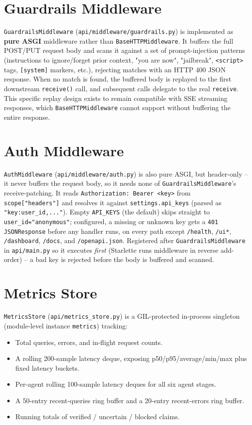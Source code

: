 \documentclass[11pt,a4paper]{report}
\newcommand{\code}[1]{\texttt{#1}}
\newcommand{\file}[1]{\texttt{\small #1}}
\begin{document}
\section{Guardrails Middleware}

\code{GuardrailsMiddleware} (\file{api/middleware/guardrails.py}) is implemented as
\textbf{pure ASGI} middleware rather than \code{BaseHTTPMiddleware}. It buffers the
full POST/PUT request body and scans it against a set of prompt-injection patterns
(instructions to ignore/forget prior context, "you are now", "jailbreak",
\code{<script>} tags, \code{[system]} markers, etc.), rejecting matches with an HTTP
400 JSON response. When no match is found, the buffered body is replayed to the first
downstream \code{receive()} call, and subsequent calls delegate to the real
\code{receive}. This specific replay design exists to remain compatible with SSE
streaming responses, which \code{BaseHTTPMiddleware} cannot support without buffering
the entire response.

\section{Auth Middleware}

\code{AuthMiddleware} (\file{api/middleware/auth.py}) is also pure ASGI, but
header-only -- it never buffers the request body, so it needs none of
\code{GuardrailsMiddleware}'s receive-patching. It reads
\code{Authorization: Bearer <key>} from \code{scope["headers"]} and resolves it
against \code{settings.api\_keys} (parsed as \code{"key:user\_id,..."}). Empty
\code{API\_KEYS} (the default) skips straight to \code{user\_id="anonymous"};
configured, a missing or unknown key gets a \code{401 JSONResponse} before any
handler runs, on every path except \code{/health}, \code{/ui*},
\code{/dashboard}, \code{/docs}, and \code{/openapi.json}. Registered after
\code{GuardrailsMiddleware} in \file{api/main.py} so it executes \emph{first}
(Starlette runs middleware in reverse add-order) -- a bad key is rejected
before the body is buffered and scanned.

\section{Metrics Store}

\code{MetricsStore} (\file{api/metrics\_store.py}) is a GIL-protected in-process
singleton (module-level instance \code{metrics}) tracking:

\begin{itemize}
    \item Total queries, errors, and in-flight request counts.
    \item A rolling 200-sample latency deque, exposing p50/p95/average/min/max plus
    fixed latency buckets.
    \item Per-agent rolling 100-sample latency deques for all six agent stages.
    \item A 50-entry recent-queries ring buffer and a 20-entry recent-errors ring
    buffer.
    \item Running totals of verified / uncertain / blocked claims.
\end{itemize}
\end{document}
